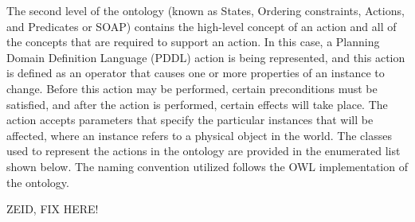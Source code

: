 \documentclass{llncs}
\begin{document}
The second level of the ontology (known as States, Ordering constraints, Actions, and Predicates or SOAP) contains the high-level concept of an action and all of the concepts 
that are required to support an action. In this case, a Planning Domain Definition Language (PDDL) \cite{PDDL} action is being represented, and this action is defined
 as an operator that causes one or more properties of an 
instance to change. Before this action may be
performed, certain preconditions must be satisfied, and after the action is performed, certain effects will take place. The action accepts parameters that specify the particular
instances that will be affected, where an instance refers to a physical object in the world. The classes used to represent the actions in the ontology are provided in the
enumerated list shown below. The naming convention utilized follows the OWL \cite{OWLoverview} implementation of the ontology.

ZEID, FIX HERE!
\end{document}
